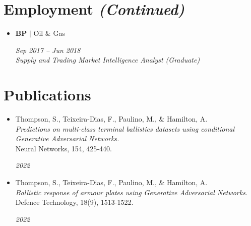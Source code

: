 \documentclass[letterpaper,11pt]{article}
\begin{document}
\section{Employment \textit{(Continued)}}
\begin{itemize}[leftmargin=0.15in, label={}]
    \item
    \begin{minipage}[t]{0.75\linewidth}
        \textbf{BP} $|$ Oil \& Gas \\
    \end{minipage} \hfill \textit{\small Sep 2017 -- Jun 2018} \\
    \vspace{-7pt}
    \textit{\small Supply and Trading Market Intelligence Analyst (Graduate)}
    \vspace{-7pt}\vspace{0.2cm}
\end{itemize}

\section{Publications}
\begin{itemize}[leftmargin=0.2in, label={}]
    \item 
        \begin{minipage}[t]{0.75\linewidth}
            Thompson, S., Teixeira-Dias, F., Paulino, M., \& Hamilton, A. \\
            \textit{Predictions on multi-class terminal ballistics datasets using conditional Generative Adversarial Networks.} \\
            Neural Networks, 154, 425-440.
        \end{minipage} \hfill \textit{2022}
\end{itemize}

\begin{itemize}[leftmargin=0.2in, label={}]
  \item
      \begin{minipage}[t]{0.75\linewidth}
          Thompson, S., Teixeira-Dias, F., Paulino, M., \& Hamilton, A. \\
          \textit{Ballistic response of armour plates using Generative Adversarial Networks.} \\
          Defence Technology, 18(9), 1513-1522.
      \end{minipage} \hfill \textit{2022}
\end{itemize}
\end{document}
